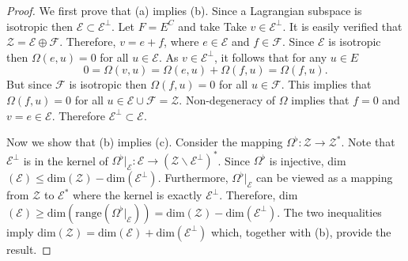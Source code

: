\begin{proof}
We first prove that (a) implies (b). Since a Lagrangian subspace is isotropic then $\mathcal E \subset \mathcal E^{\perp}$. Let $F = E^C$ and take Take $v \in \mathcal E^{\perp}$. It is easily verified that $\mathcal Z = \mathcal E \oplus\mathcal F$. Therefore, $v = e + f$, where $e \in \mathcal E$ and $f\in \mathcal F$. Since $\mathcal E$ is isotropic then $\Omega(e,u) = 0$ for all $u \in \mathcal E$. As $v\in \mathcal E^{\perp}$, it follows that for any $u\in E$
\begin{equation*}
	0 = \Omega(v,u) = \Omega(e,u) + \Omega(f,u) = \Omega(f,u).
\end{equation*}
But since $\mathcal F$ is isotropic then $\Omega(f,u) = 0$ for all $u \in \mathcal F$. This implies that $\Omega(f,u) = 0$ for all $u\in\mathcal E \cup \mathcal F = \mathcal Z$. Non-degeneracy of $\Omega$ implies that $f=0$ and $v=e\in \mathcal E$. Therefore $\mathcal E^{\perp} \subset \mathcal E$.

Now we show that (b) implies (c). Consider the mapping $\Omega^{\flat}:\mathcal Z \to \mathcal Z^*$. Note that $\mathcal E^{\perp}$ is in the kernel of $\Omega^{\flat}|_{\mathcal E} : \mathcal E \to (\mathcal Z \backslash \mathcal E^{\perp})^*$. Since $\Omega^{\flat}$ is injective, dim$(\mathcal E) \leq \text{dim}(\mathcal Z) - \text{dim}(\mathcal E^{\perp})$. Furthermore, $\Omega^{\flat}|_{\mathcal E}$ can be viewed as a mapping from $\mathcal Z$ to $\mathcal E^{*}$ where the kernel is exactly $\mathcal E^{\perp}$. Therefore, dim$(\mathcal E) \geq \text{dim}(\text{range}(\Omega^{\flat}|_{\mathcal E})) = \text{dim}(\mathcal{Z}) - \text{dim}(\mathcal E^{\perp})$. The two inequalities imply dim$(\mathcal Z) = \text{dim}(\mathcal E) + \text{dim}(\mathcal E^{\perp})$ which, together with (b), provide the result.


\end{proof}
